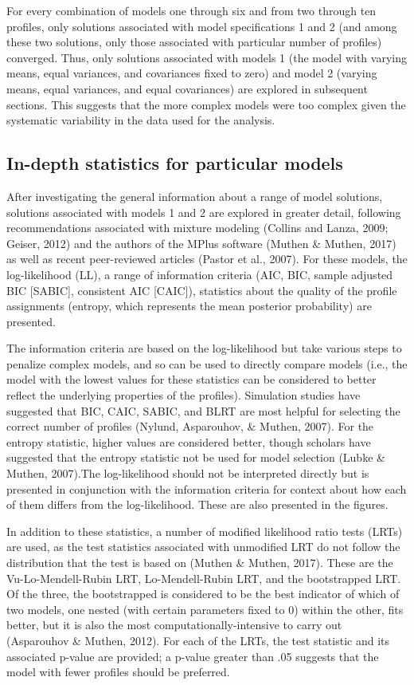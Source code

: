 \documentclass[]{book}
\theoremstyle{definition}
\theoremstyle{definition}
\theoremstyle{definition}
\theoremstyle{remark}
\begin{document}
For every combination of models one through six and from two through ten
profiles, only solutions associated with model specifications 1 and 2
(and among these two solutions, only those associated with particular
number of profiles) converged. Thus, only solutions associated with
models 1 (the model with varying means, equal variances, and covariances
fixed to zero) and model 2 (varying means, equal variances, and equal
covariances) are explored in subsequent sections. This suggests that the
more complex models were too complex given the systematic variability in
the data used for the analysis.

\subsection{In-depth statistics for particular
models}\label{in-depth-statistics-for-particular-models}

After investigating the general information about a range of model
solutions, solutions associated with models 1 and 2 are explored in
greater detail, following recommendations associated with mixture
modeling (Collins and Lanza, 2009; Geiser, 2012) and the authors of the
MPlus software (Muthen \& Muthen, 2017) as well as recent peer-reviewed
articles (Pastor et al., 2007). For these models, the log-likelihood
(LL), a range of information criteria (AIC, BIC, sample adjusted BIC
{[}SABIC{]}, consistent AIC {[}CAIC{]}), statistics about the quality of
the profile assignments (entropy, which represents the mean posterior
probability) are presented.

The information criteria are based on the log-likelihood but take
various steps to penalize complex models, and so can be used to directly
compare models (i.e., the model with the lowest values for these
statistics can be considered to better reflect the underlying properties
of the profiles). Simulation studies have suggested that BIC, CAIC,
SABIC, and BLRT are most helpful for selecting the correct number of
profiles (Nylund, Asparouhov, \& Muthen, 2007). For the entropy
statistic, higher values are considered better, though scholars have
suggested that the entropy statistic not be used for model selection
(Lubke \& Muthen, 2007).The log-likelihood should not be interpreted
directly but is presented in conjunction with the information criteria
for context about how each of them differs from the log-likelihood.
These are also presented in the figures.

In addition to these statistics, a number of modified likelihood ratio
tests (LRTs) are used, as the test statistics associated with unmodified
LRT do not follow the distribution that the test is based on (Muthen \&
Muthen, 2017). These are the Vu-Lo-Mendell-Rubin LRT, Lo-Mendell-Rubin
LRT, and the bootstrapped LRT. Of the three, the bootstrapped is
considered to be the best indicator of which of two models, one nested
(with certain parameters fixed to 0) within the other, fits better, but
it is also the most computationally-intensive to carry out (Asparouhov
\& Muthen, 2012). For each of the LRTs, the test statistic and its
associated p-value are provided; a p-value greater than .05 suggests
that the model with fewer profiles should be preferred.
\end{document}
